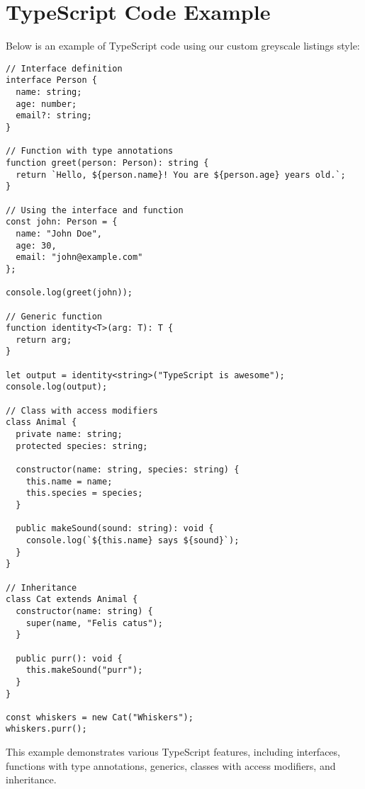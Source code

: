 \documentclass{scrreprt}
\begin{document}
\chapter{TypeScript Code Example}

Below is an example of TypeScript code using our custom greyscale listings style:

\begin{lstlisting}[style=typescript, caption=Sample TypeScript Code]
// Interface definition
interface Person {
  name: string;
  age: number;
  email?: string;
}

// Function with type annotations
function greet(person: Person): string {
  return `Hello, ${person.name}! You are ${person.age} years old.`;
}

// Using the interface and function
const john: Person = {
  name: "John Doe",
  age: 30,
  email: "john@example.com"
};

console.log(greet(john));

// Generic function
function identity<T>(arg: T): T {
  return arg;
}

let output = identity<string>("TypeScript is awesome");
console.log(output);

// Class with access modifiers
class Animal {
  private name: string;
  protected species: string;

  constructor(name: string, species: string) {
    this.name = name;
    this.species = species;
  }

  public makeSound(sound: string): void {
    console.log(`${this.name} says ${sound}`);
  }
}

// Inheritance
class Cat extends Animal {
  constructor(name: string) {
    super(name, "Felis catus");
  }

  public purr(): void {
    this.makeSound("purr");
  }
}

const whiskers = new Cat("Whiskers");
whiskers.purr();
\end{lstlisting}

This example demonstrates various TypeScript features, including interfaces, functions with type annotations, generics, classes with access modifiers, and inheritance.
\end{document}
